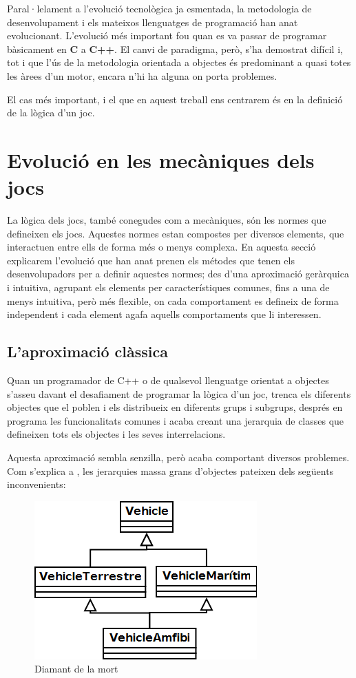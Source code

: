 Paral·lelament a l'evolució tecnològica ja esmentada, la metodologia de desenvolupament i els mateixos llenguatges de programació han anat evolucionant. L'evolució més important fou quan es va passar de programar bàsicament en {\bf C} a {\bf C++}. El canvi de paradigma, però, s'ha demostrat difícil i, tot i que l'ús de la metodologia orientada a objectes és predominant a quasi totes les àrees d'un motor, encara n'hi ha alguna on porta problemes.

El cas més important, i el que en aquest treball ens centrarem és en la definició de la lògica d'un joc.

\section{Evolució en les mecàniques dels jocs}

La lògica dels jocs, també conegudes com a mecàniques, són les normes que defineixen els jocs. Aquestes normes estan compostes per diversos elements, que interactuen entre ells de forma més o menys complexa. En aquesta secció explicarem l'evolució que han anat prenen els métodes que tenen els desenvolupadors per a definir aquestes normes; des d'una aproximació geràrquica i intuitiva, agrupant els elements per característiques comunes, fins a una de menys intuitiva, però més flexible, on cada comportament es defineix de forma independent i cada element agafa aquells comportaments que li interessen.

\subsection{L'aproximació clàssica}

Quan un programador de {C++} o de qualsevol llenguatge orientat a objectes s'asseu davant el desafiament de programar la lògica d'un joc, trenca els diferents objectes que el poblen i els distribueix en diferents grups i subgrups, després en programa les funcionalitats comunes i acaba creant una jerarquia de classes que defineixen tots els objectes i les seves interrelacions. 

Aquesta aproximació sembla senzilla, però acaba comportant diversos problemes. Com s'explica a \citep[p.~719]{Gregory09}, les jerarquies massa grans d'objectes pateixen dels següents inconvenients:


\begin{figure}
  \centering
  \includegraphics[width=0.58\linewidth]{./img/RombeMort.png}
  \caption{Diamant de la mort \label{fig:RombeMort}}
\end{figure}

